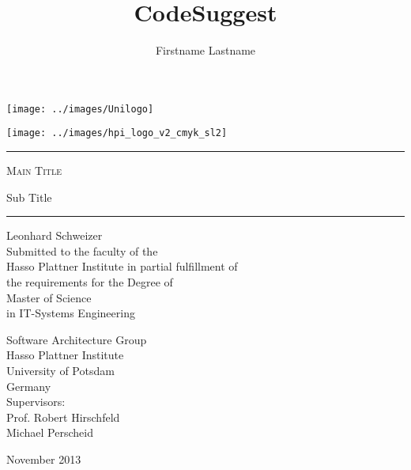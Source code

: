 \title{CodeSuggest}
\author{Firstname Lastname}
\begin{titlepage}
\pagestyle{empty}

\noindent
\begin{minipage}[b]{0.4\linewidth}
\noindent
\texttt{[image: ../images/Unilogo]}
\end{minipage}
\hfill
\begin{minipage}[b]{0.4\linewidth}
\hfill
\vspace{3mm}
\texttt{[image: ../images/hpi\_logo\_v2\_cmyk\_sl2]}
\end{minipage}

\vspace{2cm}

\begin{center}
\begin{minipage}{0.7\textwidth}
\begin{center}
\begin{large}
\hrule
\vspace{2em}
\textsc{\Huge Main Title \\[0.5em]}
\begin{doublespace}
  {\LARGE Sub Title}
  \\[1.2em]
\end{doublespace}
\hrule
\vspace{1.5cm}

{\huge Leonhard Schweizer } \\[1.5cm]

Submitted to the faculty of the \\
Hasso Plattner Institute in partial fulfillment of \\
the requirements for the Degree of \\[5mm]
{\Large Master of Science} \\[1mm]
in IT-Systems Engineering \\[2cm]

\begin{multicols}{2}
Software Architecture Group\\
Hasso Plattner Institute\\
University of Potsdam \\
Germany \\
Supervisors: \\
Prof. Robert Hirschfeld \\
Michael Perscheid \\
\end{multicols}
\end{large}
\end{center}
\end{minipage}
\vfill
{\LARGE November 2013 \\ ~ }
\end{center}
\end{titlepage}
\restoregeometry
\cleardoublepage